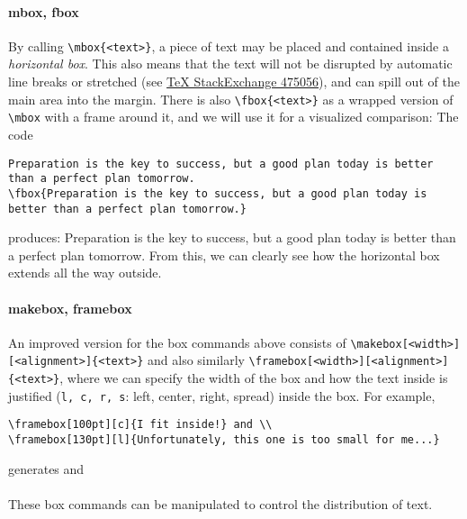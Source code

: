 \paragraph{mbox, fbox}
By calling \texttt{\textbackslash mbox\{<text>\}}, a piece of text may be placed and contained inside a \textit{horizontal box}. This also means that the text will not be disrupted by automatic line breaks or stretched (see \href{https://tex.stackexchange.com/questions/475056/hbox-mbox-difference-what-they-do}{{\TeX{} StackExchange 475056}}), and can spill out of the main area into the margin. There is also \texttt{\textbackslash fbox\{<text>\}} as a wrapped version of \texttt{\textbackslash mbox} with a frame around it, and we will use it for a visualized comparison: The code
\begin{lstlisting}
Preparation is the key to success, but a good plan today is better than a perfect plan tomorrow.
\fbox{Preparation is the key to success, but a good plan today is better than a perfect plan tomorrow.}
\end{lstlisting}
produces: Preparation is the key to success, but a good plan today is better than a perfect plan tomorrow.
From this, we can clearly see how the horizontal box extends all the way outside.

\paragraph{makebox, framebox}
An improved version for the box commands above consists of \texttt{\textbackslash makebox[<width>][<alignment>]\{<text>\}} and also similarly \texttt{\textbackslash framebox[<width>][<alignment>]\{<text>\}}, where we can specify the width of the box and how the text inside is justified (\verb|l, c, r, s|: left, center, right, spread) inside the box. For example,
\begin{lstlisting}
\framebox[100pt][c]{I fit inside!} and \\
\framebox[130pt][l]{Unfortunately, this one is too small for me...}
\end{lstlisting}
generates  and \\
 \\
These box commands can be manipulated to control the distribution of text.

